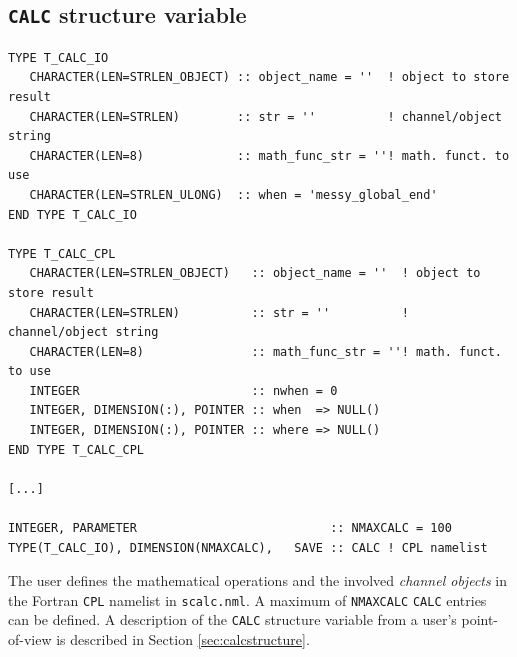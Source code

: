 \documentclass[twoside]{article}
\begin{document}
\subsection{{\tt CALC} structure variable}
\label{sec:implementationcalcstructure}
%
\begin{lstlisting}[language=FORTRAN,
   breaklines=true, %
   basicstyle=\ttfamily,        % the size of the fonts that are used for the code
   breakatwhitespace=false,         % sets if automatic breaks should only happen at whitespace
   prebreak={\raisebox{0ex}[0ex][0ex]{\space\ensuremath{\boldsymbol{\hookleftarrow}}}},
   commentstyle=\color{gray},
   label={lst:CALC},
   caption = {Definition of the structure variable {\tt CALC}. ({\tt smil/messy\_scalc\_si.f90})}
   ]
TYPE T_CALC_IO
   CHARACTER(LEN=STRLEN_OBJECT) :: object_name = ''  ! object to store result
   CHARACTER(LEN=STRLEN)        :: str = ''          ! channel/object string
   CHARACTER(LEN=8)             :: math_func_str = ''! math. funct. to use
   CHARACTER(LEN=STRLEN_ULONG)  :: when = 'messy_global_end'
END TYPE T_CALC_IO

TYPE T_CALC_CPL
   CHARACTER(LEN=STRLEN_OBJECT)   :: object_name = ''  ! object to store result
   CHARACTER(LEN=STRLEN)          :: str = ''          ! channel/object string
   CHARACTER(LEN=8)               :: math_func_str = ''! math. funct. to use
   INTEGER                        :: nwhen = 0
   INTEGER, DIMENSION(:), POINTER :: when  => NULL()
   INTEGER, DIMENSION(:), POINTER :: where => NULL()
END TYPE T_CALC_CPL

[...]

INTEGER, PARAMETER                           :: NMAXCALC = 100
TYPE(T_CALC_IO), DIMENSION(NMAXCALC),   SAVE :: CALC ! CPL namelist
\end{lstlisting}
The user defines the mathematical operations and the involved {\it channel objects} in the Fortran {\tt CPL} namelist in {\tt scalc.nml}.
A maximum of {\tt NMAXCALC} {\tt CALC} entries can be defined.
A description of the {\tt CALC} structure variable from a user's point-of-view is described in Section \ref{sec:calcstructure}.
%
\end{document}
